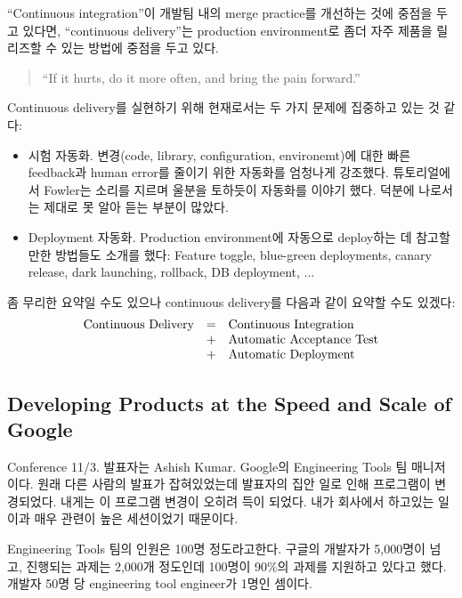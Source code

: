 \documentclass[11pt]{article}
\begin{document}
``Continuous integration''이 개발팀 내의 merge practice를 개선하는 것에
중점을 두고 있다면, ``continuous delivery''\cite{hufa10}는 
production environment로 좀더 자주 제품을 릴리즈할 수 있는 방법에 중점을 
두고 있다.

\begin{quote}
``If it hurts, do it more often, and bring the pain forward.''  
\end{quote}

Continuous delivery를 실현하기 위해 현재로서는 두 가지 문제에 집중하고 있는 
것 같다:
\begin{itemize}
\item 시험 자동화. 변경(code, library, configuration, environemt)에 대한 
빠른 feedback과 human error를 줄이기 위한 자동화를 엄청나게 강조했다. 
튜토리얼에서 Fowler는 소리를 지르며 울분을 토하듯이 자동화를 이야기 했다. 
덕분에 나로서는 제대로 못 알아 듣는 부분이 많았다.

\item Deployment 자동화. Production environment에 자동으로 deploy하는 데 
참고할 만한 방법들도 소개를 했다: Feature toggle, blue-green deployments, 
canary release, dark launching, rollback, DB deployment, ...
\end{itemize}

좀 무리한 요약일 수도 있으나 continuous delivery를 다음과 같이 요약할 수도 
있겠다:
\[
\begin{array}{rcl}
    \textrm{Continuous Delivery} & = & \textrm{Continuous Integration} \\
                               & + & \textrm{Automatic Acceptance Test} \\
                               & + & \textrm{Automatic Deployment}
\end{array}
\]

\subsection{Developing Products at the Speed and Scale of Google}

Conference 11/3.
발표자는 Ashish Kumar. Google의 Engineering Tools 팀 매니저이다.
원래 다른 사람의 발표가 잡혀있었는데 발표자의 집안 일로 인해 프로그램이 
변경되었다. 내게는 이 프로그램 변경이 오히려 득이 되었다.
내가 회사에서 하고있는 일이과 매우 관련이 높은 세션이었기 때문이다.

Engineering Tools 팀의 인원은 100명 정도라고한다. 구글의 개발자가 5,000명이 
넘고, 진행되는 과제는 2,000개 정도인데 100명이 90\%의 과제를 지원하고 있다고 
했다. 개발자 50명 당 engineering tool engineer가 1명인 셈이다.
\end{document}
